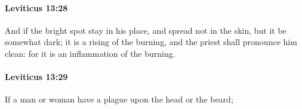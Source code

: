 		\paragraph{Leviticus 13:28} %
			\label{LEVITICUS-13-28}

			And if the bright spot stay in his place, and spread not in the skin, but it be somewhat dark; it is a rising of the burning, and the priest shall pronounce him clean: for it is an inflammation of the burning.


		\paragraph{Leviticus 13:29} %
			\label{LEVITICUS-13-29}

			If a man or woman have a plague upon the head or the beard;


